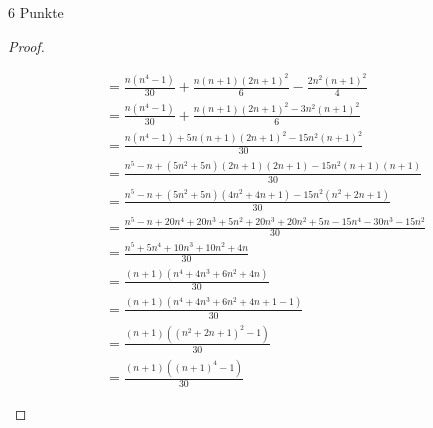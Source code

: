 \documentclass{../problemset}
\begin{document}
\begin{problem}[Summenformeln]{6 Punkte}
\begin{proof}
\begin{enumerate}
\begin{align}
			                                        & = \frac{n(n^4 - 1)}{30} + \frac{n(n+1)(2n+1)^2}{6} - \frac{2n^2(n+1)^2}{4}                                \\
			                                        & = \frac{n(n^4 - 1)}{30} + \frac{n(n+1)(2n+1)^2 - 3n^2(n+1)^2}{6}                                          \\
			                                        & = \frac{n(n^4 - 1) + 5n(n+1)(2n+1)^2 - 15n^2(n+1)^2}{30}                                                  \\
			                                        & = \frac{n^5 - n + (5n^2+5n)(2n+1)(2n+1) - 15n^2(n+1)(n+1)}{30}                                            \\
			                                        & = \frac{n^5 - n + (5n^2+5n)(4n^2 + 4n +1) - 15n^2(n^2 + 2n +1)}{30}                                       \\
			                                        & = \frac{n^5 - n + 20n^4 + 20n^3 + 5n^2 + 20n^3 + 20n^2 + 5n - 15n^4- 30n^3 - 15n^2}{30}                   \\
			                                        & = \frac{n^5 + 5n^4 + 10n^3 + 10n^2 + 4n}{30}                                                              \\
			                                        & = \frac{(n+1)(n^4+4n^3+6n^2+4n)}{30} \tag{Polynomdivision}                                                \\
			                                        & = \frac{(n+1)(n^4+4n^3+6n^2+4n + 1 - 1)}{30}                                                              \\
			                                        & = \frac{(n+1)((n^2 + 2n +1)^2 - 1)}{30}                                                                   \\
			                                        & = \frac{(n+1)((n + 1)^4 - 1)}{30}
		      \end{align}
	\end{enumerate}
\end{proof}
\end{problem}
\end{document}
